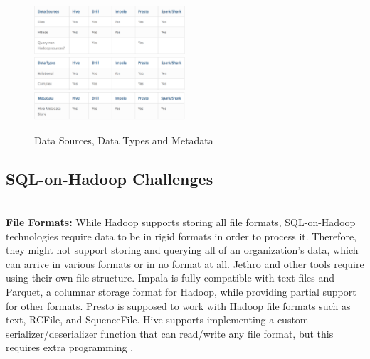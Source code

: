 \documentclass[twocolumn]{article}
\begin{document}
\begin{figure}[htb]
        \centering
        \includegraphics[width=0.5\textwidth]{dst05}
        \includegraphics[width=0.5\textwidth]{dst06}
        \includegraphics[width=0.5\textwidth]{dst07}
        \caption{Data Sources, Data Types and Metadata}
        \label{dst06}
\end{figure}
%
%

\subsection*{SQL-on-Hadoop Challenges}

\noindent
\\
\textbf{File Formats: }
While Hadoop supports storing all file formats, SQL-on-Hadoop technologies require data to be in rigid formats in order to process it. Therefore, they might not support storing and querying all of an organization’s data, which can arrive in various formats or in no format at all. Jethro and other tools require using their own file structure. Impala is fully compatible with text files and Parquet, a columnar storage format for Hadoop, while providing partial support for other formats. Presto is supposed to work with Hadoop file formats such as text, RCFile, and SquenceFile. Hive supports implementing a custom serializer/deserializer function that can read/write any file format, but this requires extra programming \cite{Mor}.
\end{document}
